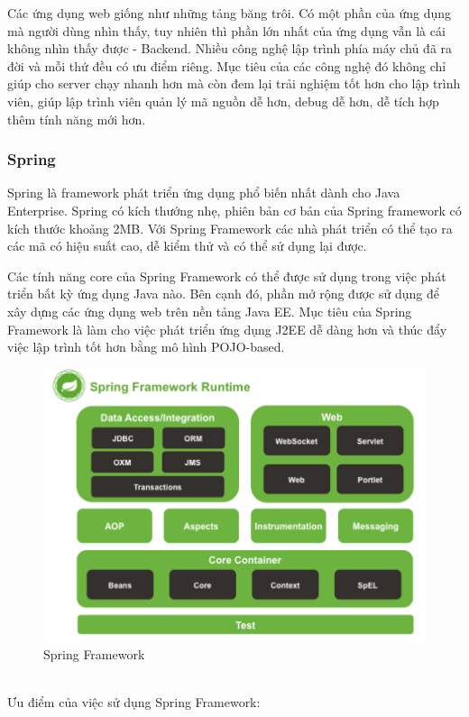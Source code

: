 Các ứng dụng web giống như những tảng băng trôi. Có một phần của ứng dụng mà người dùng nhìn thấy, tuy nhiên thì phần lớn nhất của ứng dụng vẫn là cái không nhìn thấy được - Backend. Nhiều công nghệ lập trình phía máy chủ đã ra đời và mỗi thứ đều có ưu điểm riêng. Mục tiêu của các công nghệ đó không chỉ giúp cho server chạy nhanh hơn mà còn đem lại trải nghiệm tốt hơn cho lập trình viên, giúp lập trình viên quản lý mã nguồn dễ hơn, debug dễ hơn, dễ tích hợp thêm tính năng mới hơn.
\subsubsection{Spring}
Spring là framework phát triển ứng dụng phổ biến nhất dành cho Java Enterprise. Spring có kích thướng nhẹ, phiên bản cơ bản của Spring framework có kích thước khoảng 2MB. Với Spring Framework các nhà phát triển có thể tạo ra các mã có hiệu suất cao, dễ kiểm thử và có thể sử dụng lại được.\par
Các tính năng core của Spring Framework có thể được sử dụng trong việc phát triển bất kỳ ứng dụng Java nào. Bên cạnh đó, phần mở rộng được sử dụng để xây dựng các ứng dụng web trên nền tảng Java EE. Mục tiêu của Spring Framework là làm cho việc phát triển ứng dụng J2EE dễ dàng hơn và thúc đẩy việc lập trình tốt hơn bằng mô hình POJO-based.
\begin{figure}[H]
    \begin{center}
        \includegraphics[width=12cm]{Image/Technical/spring_framework.png}
        \caption{Spring Framework}
        \label{spring}
    \end{center}
\end{figure}
\\
Ưu điểm của việc sử dụng Spring Framework:
